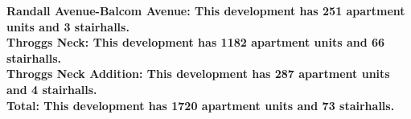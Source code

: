 \bf{Randall Avenue-Balcom Avenue}: This development has 251 apartment units and 3 stairhalls.\\\bf{Throggs Neck}: This development has 1182 apartment units and 66 stairhalls.\\\bf{Throggs Neck Addition}: This development has 287 apartment units and 4 stairhalls.\\\bf{Total}: This development has 1720 apartment units and 73 stairhalls.\\